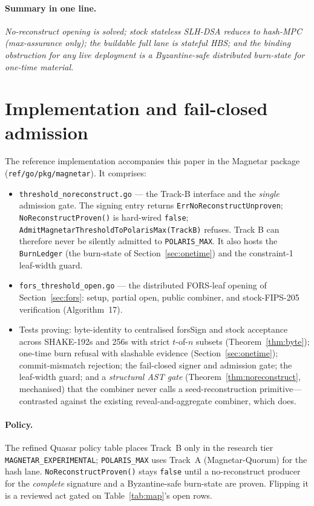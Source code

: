\documentclass[11pt,a4paper]{article}
\begin{document}
\paragraph{Summary in one line.} \emph{No-reconstruct opening is solved; stock
stateless SLH-DSA reduces to hash-MPC (max-assurance only); the buildable full lane
is stateful HBS; and the binding obstruction for any live deployment is a
Byzantine-safe distributed burn-state for one-time material.}

\section{Implementation and fail-closed admission}
\label{sec:impl}

The reference implementation accompanies this paper in the Magnetar package
(\texttt{ref/\allowbreak go/\allowbreak pkg/\allowbreak magnetar}). It comprises:

\begin{itemize}[leftmargin=1.4em]
\item \texttt{threshold\_noreconstruct.go} --- the Track-B interface and the
\emph{single} admission gate. The signing entry returns
\texttt{ErrNoReconstructUnproven}; \texttt{NoReconstructProven()} is hard-wired
\texttt{false}; \texttt{AdmitMagnetarThresholdToPolarisMax(TrackB)} refuses. Track B
can therefore never be silently admitted to \texttt{POLARIS\_MAX}. It also hosts the
\texttt{BurnLedger} (the burn-state of Section~\ref{sec:onetime}) and the
constraint-1 leaf-width guard.
\item \texttt{fors\_threshold\_open.go} --- the distributed FORS-leaf opening of
Section~\ref{sec:fors}: setup, partial open, public combiner, and stock-FIPS-205
verification (Algorithm~17).
\item Tests proving: byte-identity to centralised \textsf{forsSign} and stock
acceptance across SHAKE-192s and 256s with strict $t$-of-$n$ subsets
(Theorem~\ref{thm:byte}); one-time burn refusal with slashable evidence
(Section~\ref{sec:onetime}); commit-mismatch rejection; the fail-closed signer and
admission gate; the leaf-width guard; and a \emph{structural AST gate}
(Theorem~\ref{thm:noreconstruct}, mechanised) that the combiner never calls a
seed-reconstruction primitive---contrasted against the existing reveal-and-aggregate
combiner, which does.
\end{itemize}

\paragraph{Policy.} The refined Quasar policy table places Track~B only in the
research tier \texttt{MAGNETAR\_EXPERIMENTAL}; \texttt{POLARIS\_MAX} uses Track~A
(Magnetar-Quorum) for the hash lane. \texttt{NoReconstructProven()} stays
\texttt{false} until a no-reconstruct producer for the \emph{complete} signature and
a Byzantine-safe burn-state are proven. Flipping it is a reviewed act gated on
Table~\ref{tab:map}'s open rows.
\end{document}

